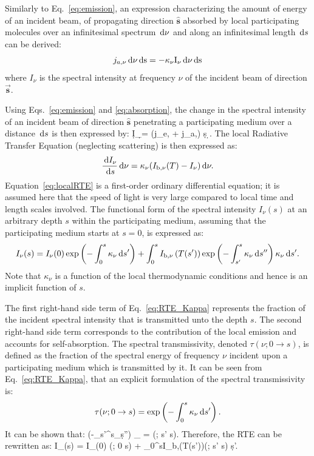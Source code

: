 Similarly to Eq.~\ref{eq:emission}, an expression characterizing the amount of energy of an incident beam, of propagating direction $\hat{\textbf{s}}$ absorbed by local participating molecules over an infinitesimal spectrum $\,\mathrm{d}\nu$ and along an infinitesimal length $\,\mathrm{d} s$ can be derived:
\begin{equation}\label{eq:absorption}
  j_{a,\nu} \,\mathrm{d}\nu \,\mathrm{d} \rm s = - \kappa_{\nu} I_{\nu} \,\mathrm{d}\nu \,\mathrm{d} \rm s
\end{equation}
where $I_{\nu}$ is the spectral intensity at frequency $\nu$ of the incident beam of direction $\vec{\textbf{s}}$.

Using Eqs.~\ref{eq:emission} and \ref{eq:absorption}, the change in the spectral intensity of an incident beam of direction $\hat{\textbf{s}}$ penetrating a participating medium over a distance $\,\mathrm{d} s$ is then expressed by:
\be
\d I_{\nu}\d \nu = (j_{e,\nu} + j_{a,\nu}) \d s \d\nu.
\ee
The local Radiative Transfer Equation (neglecting scattering) is then expressed as:
\begin{equation}\label{eq:localRTE}
 \dfrac{\,\mathrm{d} I_{\nu}}{\,\mathrm{d} s}\,\mathrm{d} \nu = \kappa_{\nu} (I_{\rm b,\nu}(T) - I_{\nu}) \,\mathrm{d} \nu.
\end{equation}
Equation~\ref{eq:localRTE} is a first-order ordinary differential equation; it is assumed here that the speed of light is very large compared to local time and length scales involved. The functional form of the spectral intensity $I_{\nu}(s)$ at an arbitrary depth $s$ within the participating medium, assuming that the participating medium starts at $s=0$, is expressed as:
\begin{equation}\label{eq:RTE_Kappa}
I_{\nu}(s) =  I_{\nu}(0) \exp\left(-\displaystyle\int_{0}^{s}{\kappa_{\nu}\,\mathrm{d} s}'\right) + \displaystyle\int_0^{s}{I_{\rm b,\nu}\left(T(s')\right)\exp\left(-\displaystyle\int_{s'}^{s}{\kappa_{\nu}\,\mathrm{d} s''}  \right)\kappa_{\nu} \,\mathrm{d} s'}.
\end{equation}
Note that $\kappa_{\nu}$ is a function of the local thermodynamic conditions and hence is an implicit function of $s$.

The first right-hand side term of Eq.~\ref{eq:RTE_Kappa} represents the fraction of the incident spectral intensity that is transmitted unto the depth $s$. The second right-hand side term corresponds to the contribution of the local emission and accounts for self-absorption.
The spectral transmissivity, denoted $\tau(\nu; 0 \rightarrow s)$, is defined as the fraction of the spectral energy of frequency $\nu$ incident upon a participating medium which is transmitted by it. It can be seen from Eq.~\ref{eq:RTE_Kappa}, that an explicit formulation of the spectral transmissivity is:
\begin{equation}\label{eq:tau_definition}
 \tau(\nu; 0 \rightarrow s) = \exp\left(-\displaystyle\int_{0}^{s}{\kappa_{\nu}\,\mathrm{d} s'}\right).
\end{equation}
It can be shown that:
\be
\exp\left(-\displaystyle\int_{s'}^{s}{\kappa_{\nu}\d s''}\right) \kappa_{\nu} = (\nu; s' \rightarrow s).
\ee
Therefore, the RTE can be rewritten as:
\be\label{eq:RTE_Final}
I_{\nu}(s) =  I_{\nu}(0) \tau(\nu; 0 \rightarrow s) + \displaystyle\int_0^{s}{I_{\rm b,\nu}\left(T(s')\right)(\nu; s' \rightarrow s) \d s'}.
\ee

